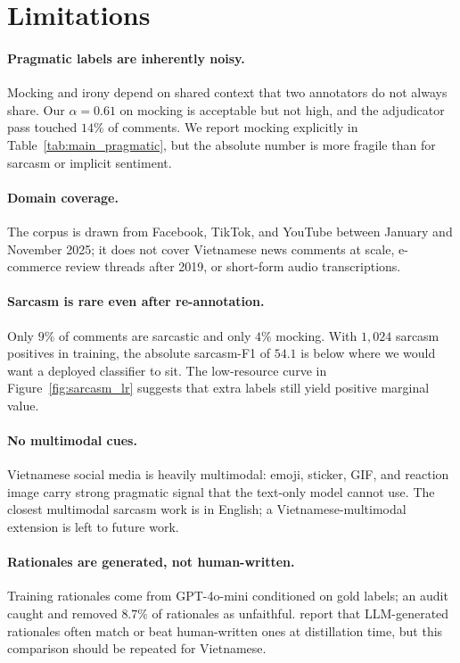 \section{Limitations}

\paragraph{Pragmatic labels are inherently noisy.}
Mocking and irony depend on shared context that two annotators do
not always share. Our $\alpha{=}0.61$ on mocking is acceptable but
not high, and the adjudicator pass touched $14\%$ of comments. We
report mocking explicitly in Table~\ref{tab:main_pragmatic}, but the
absolute number is more fragile than for sarcasm or implicit
sentiment.

\paragraph{Domain coverage.}
The \method{} corpus is drawn from Facebook, TikTok, and YouTube
between January and November 2025; it does not cover Vietnamese
news comments at scale, e-commerce review threads after 2019, or
short-form audio transcriptions.

\paragraph{Sarcasm is rare even after re-annotation.}
Only $9\%$ of comments are sarcastic and only $4\%$ mocking. With
$1{,}024$ sarcasm positives in training, the absolute sarcasm-F1 of
$54.1$ is below where we would want a deployed classifier to sit.
The low-resource curve in Figure~\ref{fig:sarcasm_lr} suggests that
extra labels still yield positive marginal value.

\paragraph{No multimodal cues.}
Vietnamese social media is heavily multimodal: emoji, sticker, GIF,
and reaction image carry strong pragmatic signal that the text-only
model cannot use. The closest multimodal sarcasm work
\citep{cai2019multimodal} is in English; a Vietnamese-multimodal
extension is left to future work.

\paragraph{Rationales are generated, not human-written.}
Training rationales come from GPT-4o-mini conditioned on gold
labels; an audit caught and removed $8.7\%$ of rationales as
unfaithful. \citet{hsieh2023distillstep} report that LLM-generated
rationales often match or beat human-written ones at distillation
time, but this comparison should be repeated for Vietnamese.

